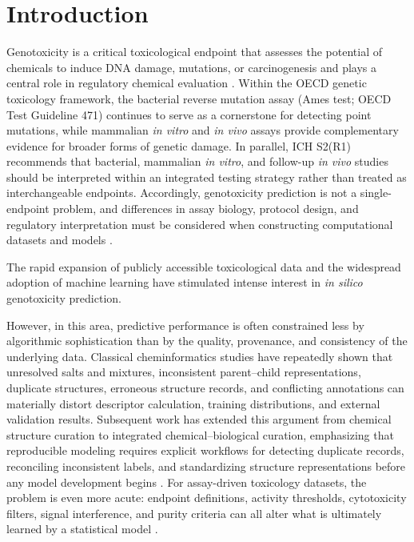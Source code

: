 \section{Introduction}\label{sec:intro}

Genotoxicity is a critical toxicological endpoint that assesses the potential of chemicals to induce DNA damage, 
mutations, or carcinogenesis and plays a central role in regulatory chemical evaluation \cite{Karamertzanis2025, Hayashi2022, EFSA2018}.
Within the OECD genetic toxicology framework, the bacterial reverse mutation assay (Ames test; OECD Test Guideline 471) 
continues to serve as a cornerstone for detecting point mutations, while mammalian \textit{in vitro} and \textit{in vivo} 
assays provide complementary evidence for broader forms of genetic damage. In parallel, ICH S2(R1) recommends that bacterial, 
mammalian \textit{in vitro}, and follow-up \textit{in vivo} studies should be interpreted within an integrated testing 
strategy rather than treated as interchangeable endpoints. Accordingly, genotoxicity prediction is not a 
single-endpoint problem, and differences in assay biology, protocol design, and regulatory interpretation must be considered 
when constructing computational datasets and models \cite{OECDOverview2017,OECD4712020,ICHS2R1}.

The rapid expansion of publicly accessible toxicological data and the widespread adoption of machine learning 
have stimulated intense interest in \textit{in silico} genotoxicity prediction\cite{HASSELGREN2019104403}.

However, in this area, predictive performance is often constrained less by algorithmic sophistication than by the quality, 
provenance, and consistency of the underlying data. Classical cheminformatics studies have repeatedly shown that 
unresolved salts and mixtures, inconsistent parent--child representations, duplicate structures, erroneous structure records, 
and conflicting annotations can materially distort descriptor calculation, training distributions, and external validation 
results. Subsequent work has extended this argument from chemical structure curation to integrated chemical--biological 
curation, emphasizing that reproducible modeling requires explicit workflows for detecting duplicate records, 
reconciling inconsistent labels, and standardizing structure representations before any model development begins \cite{Fourches2010,Fourches2016}. 
For assay-driven toxicology datasets, the problem is even more acute: endpoint definitions, activity thresholds, 
cytotoxicity filters, signal interference, and purity criteria can all alter what is ultimately learned by a statistical model \cite{Nikolov2023}.

